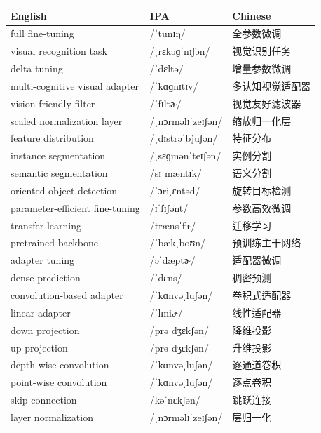 \documentclass[UTF8,12pt,a4paper]{ctexart}
\providecommand{\zh}[1]{#1}
\begin{document}
\begin{tabular*}{\textwidth}{@{\extracolsep{\fill}}lll@{}}
\toprule
\textbf{English} & \textbf{IPA} & \textbf{Chinese} \\
\midrule
full fine-tuning & {\ipafont /ˈtunɪŋ/} & \zh{全参数微调} \\
visual recognition task & {\ipafont /ˌrɛkəɡˈnɪʃən/} & \zh{视觉识别任务} \\
delta tuning & {\ipafont /ˈdɛltə/} & \zh{增量参数微调} \\
multi-cognitive visual adapter & {\ipafont /ˈkɑɡnɪtɪv/} & \zh{多认知视觉适配器} \\
vision-friendly filter & {\ipafont /ˈfɪltɚ/} & \zh{视觉友好滤波器} \\
scaled normalization layer & {\ipafont /ˌnɔrməlɪˈzeɪʃən/} & \zh{缩放归一化层} \\
feature distribution & {\ipafont /ˌdɪstrəˈbjuʃən/} & \zh{特征分布} \\
instance segmentation & {\ipafont /ˌsɛɡmənˈteɪʃən/} & \zh{实例分割} \\
semantic segmentation & {\ipafont /sɪˈmæntɪk/} & \zh{语义分割} \\
oriented object detection & {\ipafont /ˈɔriˌɛntəd/} & \zh{旋转目标检测} \\
parameter-efficient fine-tuning & {\ipafont /ɪˈfɪʃənt/} & \zh{参数高效微调} \\
transfer learning & {\ipafont /trænsˈfɝ/} & \zh{迁移学习} \\
pretrained backbone & {\ipafont /ˈbækˌboʊn/} & \zh{预训练主干网络} \\
adapter tuning & {\ipafont /əˈdæptɚ/} & \zh{适配器微调} \\
dense prediction & {\ipafont /ˈdɛns/} & \zh{稠密预测} \\
convolution-based adapter & {\ipafont /ˈkɑnvəˌluʃən/} & \zh{卷积式适配器} \\
linear adapter & {\ipafont /ˈlɪniɚ/} & \zh{线性适配器} \\
down projection & {\ipafont /prəˈdʒɛkʃən/} & \zh{降维投影} \\
up projection & {\ipafont /prəˈdʒɛkʃən/} & \zh{升维投影} \\
depth-wise convolution & {\ipafont /ˈkɑnvəˌluʃən/} & \zh{逐通道卷积} \\
point-wise convolution & {\ipafont /ˈkɑnvəˌluʃən/} & \zh{逐点卷积} \\
skip connection & {\ipafont /kəˈnɛkʃən/} & \zh{跳跃连接} \\
layer normalization & {\ipafont /ˌnɔrməlɪˈzeɪʃən/} & \zh{层归一化} \\

\end{tabular*}
\end{document}
